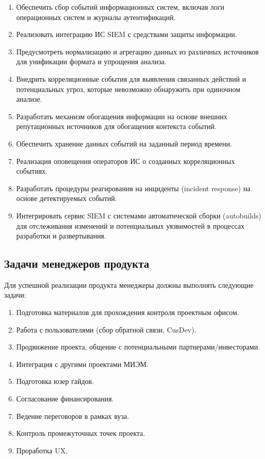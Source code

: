 \documentclass[14pt, a4paper]{extarticle}
\begin{document}
\begin{enumerate}
\item Обеспечить сбор событий информационных систем, включая логи операционных систем и журналы аутентификаций.
\item Реализовать интеграцию ИС SIEM с средствами защиты информации.
\item Предусмотреть нормализацию и агрегацию данных из различных источников для унификации формата и упрощения анализа.
\item Внедрить корреляционные события для выявления связанных действий и потенциальных угроз, которые невозможно обнаружить при одиночном анализе.
\item Разработать механизм обогащения информации на основе внешних репутационных источников для обогащения контекста событий.
\item Обеспечить хранение данных событий на заданный период времени.
\item Реализация оповещения операторов ИС о созданных корреляционных событиях.
\item Разработать процедуры реагирования на инциденты (incident response) на основе детектируемых событий.
\item Интегрировать сервис SIEM с системами автоматической сборки (autobuilds) для отслеживания изменений и потенциальных уязвимостей в процессах разработки и развертывания.
\end{enumerate}

\subsection{Задачи менеджеров продукта}

Для успешной реализации продукта менеджеры должны выполнять следующие задачи:

\begin{enumerate}
\item Подготовка материалов для прохождения контроля проектным офисом.
\item Работа с пользователями (сбор обратной связи, CusDev).
\item Продвижение проекта, общение с потенциальными партнерами/инвесторами.
\item Интеграция с другими проектами МИЭМ.
\item Подготовка юзер гайдов.
\item Согласование финансирования.
\item Ведение переговоров в рамках вуза.
\item Контроль промежуточных точек проекта.
\item Проработка UX.
\end{enumerate}
\end{document}
